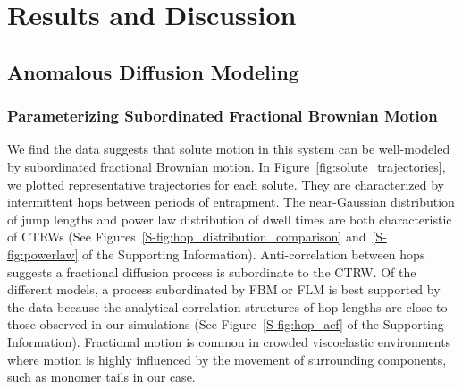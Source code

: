 \documentclass[journal=jctcce,manuscript=article]{achemso}
\begin{document}
  \section{Results and Discussion}
  
  \subsection{Anomalous Diffusion Modeling}\label{section:sFBM}
  
  \subsubsection{Parameterizing Subordinated Fractional Brownian Motion}\label{section:AD_parameterization}

  We find the data suggests that solute motion in this system can be
  well-modeled by subordinated fractional Brownian motion. In
  Figure~\ref{fig:solute_trajectories}, we plotted representative trajectories
  for each solute. They are characterized by intermittent hops between periods
  of entrapment. The near-Gaussian distribution of jump lengths and power law
  distribution of dwell times are both characteristic of CTRWs
  (See Figures~\ref{S-fig:hop_distribution_comparison} and~\ref{S-fig:powerlaw}
  of the Supporting Information). 
  Anti-correlation between hops suggests a fractional diffusion process is 
  subordinate to the CTRW. Of the different models, a process subordinated by 
  FBM or FLM is best supported by the data because the analytical correlation 
  structures of hop lengths are close to those observed in our simulations 
  (See Figure~\ref{S-fig:hop_acf} of the Supporting Information). Fractional 
  motion is common in crowded viscoelastic environments where motion is highly
  influenced by the movement of surrounding components, such as monomer tails 
  in our case.~\cite{ernst_fractional_2012}
  
\end{document}
